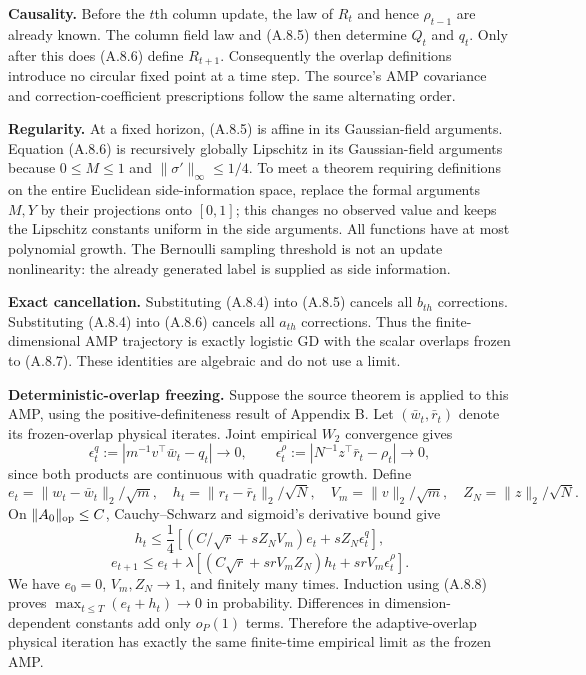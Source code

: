 \documentclass[
  11pt,
  a4paper,
]{article}
\begin{document}
\textbf{Causality.} Before the \(t\)th column update, the law of \(R_t\)
and hence \(\rho_{t-1}\) are already known. The column field law and
(A.8.5) then determine \(Q_t\) and \(q_t\). Only after this does (A.8.6)
define \(R_{t+1}\). Consequently the overlap definitions introduce no
circular fixed point at a time step. The source's AMP covariance and
correction-coefficient prescriptions follow the same alternating order.

\textbf{Regularity.} At a fixed horizon, (A.8.5) is affine in its
Gaussian-field arguments. Equation (A.8.6) is recursively globally
Lipschitz in its Gaussian-field arguments because \(0\le M\le1\) and
\(\|\sigma'\|_\infty\le1/4\). To meet a theorem requiring definitions on
the entire Euclidean side-information space, replace the formal
arguments \(M,Y\) by their projections onto \([0,1]\); this changes no
observed value and keeps the Lipschitz constants uniform in the side
arguments. All functions have at most polynomial growth. The Bernoulli
sampling threshold is not an update nonlinearity: the already generated
label is supplied as side information.

\textbf{Exact cancellation.} Substituting (A.8.4) into (A.8.5) cancels
all \(b_{th}\) corrections. Substituting (A.8.4) into (A.8.6) cancels
all \(a_{th}\) corrections. Thus the finite-dimensional AMP trajectory
is exactly logistic GD with the scalar overlaps frozen to (A.8.7). These
identities are algebraic and do not use a limit.

\textbf{Deterministic-overlap freezing.} Suppose the source theorem is
applied to this AMP, using the positive-definiteness result of Appendix
B. Let \((\bar w_t,\bar r_t)\) denote its frozen-overlap physical
iterates. Joint empirical \(W_2\) convergence gives \[
\epsilon^q_t:=|m^{-1}v^\top\bar w_t-q_t|\to0,
\qquad
\epsilon^\rho_t:=|N^{-1}z^\top\bar r_t-\rho_t|\to0,
\tag{A.8.8}
\] since both products are continuous with quadratic growth. Define \[
e_t=\|w_t-\bar w_t\|_2/\sqrt m,\quad
h_t=\|r_t-\bar r_t\|_2/\sqrt N,\quad
V_m=\|v\|_2/\sqrt m,\quad Z_N=\|z\|_2/\sqrt N.
\] On \(\|A_0\|_{\rm op}\le C\), Cauchy--Schwarz and sigmoid's
derivative bound give \[
h_t\le\frac14\left[\left(C/\sqrt r+sZ_NV_m\right)e_t+sZ_N\epsilon^q_t\right],
\tag{A.8.9}
\] \[
e_{t+1}\le e_t+\lambda\left[\left(C\sqrt r+s rV_mZ_N\right)h_t+s rV_m\epsilon^\rho_t\right].
\tag{A.8.10}
\] We have \(e_0=0\), \(V_m,Z_N\to1\), and finitely many times.
Induction using (A.8.8) proves \(\max_{t\le T}(e_t+h_t)\to0\) in
probability. Differences in dimension-dependent constants add only
\(o_P(1)\) terms. Therefore the adaptive-overlap physical iteration has
exactly the same finite-time empirical limit as the frozen AMP.
\end{document}
